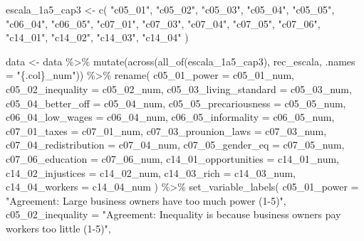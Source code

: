 \documentclass[
  letterpaper,
  DIV=11,
  numbers=noendperiod]{scrreprt}
\newenvironment{Shaded}{\begin{snugshade}}{\end{snugshade}}
\newcommand{\AttributeTok}[1]{\textcolor[rgb]{0.40,0.45,0.13}{#1}}
\newcommand{\FunctionTok}[1]{\textcolor[rgb]{0.28,0.35,0.67}{#1}}
\newcommand{\NormalTok}[1]{\textcolor[rgb]{0.00,0.23,0.31}{#1}}
\newcommand{\OtherTok}[1]{\textcolor[rgb]{0.00,0.23,0.31}{#1}}
\newcommand{\SpecialCharTok}[1]{\textcolor[rgb]{0.37,0.37,0.37}{#1}}
\newcommand{\StringTok}[1]{\textcolor[rgb]{0.13,0.47,0.30}{#1}}
\begin{document}
\begin{Shaded}
\begin{Highlighting}[]
\NormalTok{escala\_1a5\_cap3 }\OtherTok{\textless{}{-}} \FunctionTok{c}\NormalTok{(}
  \StringTok{"c05\_01"}\NormalTok{, }\StringTok{"c05\_02"}\NormalTok{, }\StringTok{"c05\_03"}\NormalTok{, }\StringTok{"c05\_04"}\NormalTok{, }\StringTok{"c05\_05"}\NormalTok{,}
  \StringTok{"c06\_04"}\NormalTok{, }\StringTok{"c06\_05"}\NormalTok{,}
  \StringTok{"c07\_01"}\NormalTok{, }\StringTok{"c07\_03"}\NormalTok{, }\StringTok{"c07\_04"}\NormalTok{, }\StringTok{"c07\_05"}\NormalTok{, }\StringTok{"c07\_06"}\NormalTok{,}
  \StringTok{"c14\_01"}\NormalTok{, }\StringTok{"c14\_02"}\NormalTok{, }\StringTok{"c14\_03"}\NormalTok{, }\StringTok{"c14\_04"}
\NormalTok{)}

\NormalTok{data }\OtherTok{\textless{}{-}}\NormalTok{ data }\SpecialCharTok{\%\textgreater{}\%}
  \FunctionTok{mutate}\NormalTok{(}\FunctionTok{across}\NormalTok{(}\FunctionTok{all\_of}\NormalTok{(escala\_1a5\_cap3), rec\_escala, }\AttributeTok{.names =} \StringTok{"\{.col\}\_num"}\NormalTok{)) }\SpecialCharTok{\%\textgreater{}\%}
  \FunctionTok{rename}\NormalTok{(}
    \AttributeTok{c05\_01\_power           =}\NormalTok{ c05\_01\_num,}
    \AttributeTok{c05\_02\_inequality      =}\NormalTok{ c05\_02\_num,}
    \AttributeTok{c05\_03\_living\_standard =}\NormalTok{ c05\_03\_num,}
    \AttributeTok{c05\_04\_better\_off      =}\NormalTok{ c05\_04\_num,}
    \AttributeTok{c05\_05\_precariousness  =}\NormalTok{ c05\_05\_num,}
    \AttributeTok{c06\_04\_low\_wages       =}\NormalTok{ c06\_04\_num,}
    \AttributeTok{c06\_05\_informality     =}\NormalTok{ c06\_05\_num,}
    \AttributeTok{c07\_01\_taxes           =}\NormalTok{ c07\_01\_num,}
    \AttributeTok{c07\_03\_prounion\_laws   =}\NormalTok{ c07\_03\_num,}
    \AttributeTok{c07\_04\_redistribution  =}\NormalTok{ c07\_04\_num,}
    \AttributeTok{c07\_05\_gender\_eq       =}\NormalTok{ c07\_05\_num,}
    \AttributeTok{c07\_06\_education       =}\NormalTok{ c07\_06\_num,}
    \AttributeTok{c14\_01\_opportunities   =}\NormalTok{ c14\_01\_num,}
    \AttributeTok{c14\_02\_injustices      =}\NormalTok{ c14\_02\_num,}
    \AttributeTok{c14\_03\_rich            =}\NormalTok{ c14\_03\_num,}
    \AttributeTok{c14\_04\_workers         =}\NormalTok{ c14\_04\_num}
\NormalTok{  ) }\SpecialCharTok{\%\textgreater{}\%}
  \FunctionTok{set\_variable\_labels}\NormalTok{(}
    \AttributeTok{c05\_01\_power           =} \StringTok{"Agreement: Large business owners have too much power (1{-}5)"}\NormalTok{,}
    \AttributeTok{c05\_02\_inequality      =} \StringTok{"Agreement: Inequality is because business owners pay workers too little (1{-}5)"}\NormalTok{,}

\end{Highlighting}
\end{Shaded}
\end{document}
